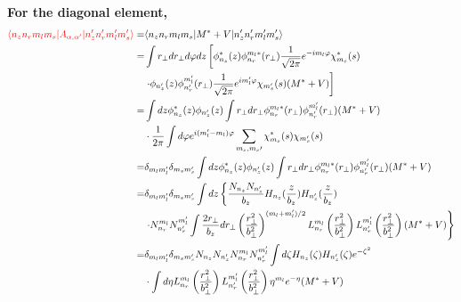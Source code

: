 \textbf{For the diagonal element,}
\begin{equation}
\begin{aligned}
  \textcolor{red}{\langle n_z n_r m_l m_s | A_{\alpha, \alpha^{\prime}} | n_z^{\prime} n_r^{\prime} m_l^{\prime} m_s^{\prime} \rangle} 
  =& \langle n_z n_r m_l m_s | M^* + V | n_z^{\prime} n_r^{\prime} m_l^{\prime} m_s^{\prime} \rangle \\
  =& \int r_{\perp}dr_{\perp}d\varphi dz \left[ \phi_{n_z}^{\ast}(z) \phi_{n_r}^{m_l\ast}(r_{\perp}) \frac{1}{\sqrt{2\pi}}e^{-im_l\varphi} \chi_{m_s}^{\ast}(s) \right.\\
  & \left. \cdot \phi_{n_z^{\prime}}(z) \phi_{n_r^{\prime}}^{m_l^{\prime}}(r_{\perp}) \frac{1}{\sqrt{2\pi}}e^{im_l^{\prime}\varphi} \chi_{m_s^{\prime}}(s) (M^{\ast} + V) \right]  \\
  =& \int dz \phi_{n_z}^{\ast}(z)\phi_{n_z^{\prime}}(z) \int r_{\perp}dr_{\perp}\phi_{n_r}^{m_l\ast}(r_{\perp})\phi_{n_r^{\prime}}^{m_l^{\prime}}(r_{\perp})(M^{\ast}+V)  \\
  & \cdot \frac{1}{2\pi} \int d\varphi e^{i(m_l^{\prime} - m_l)\varphi} \sum_{m_s, m_{s}{\prime}} \chi_{m_s}^{\ast}(s)\chi_{m_s^{\prime}}(s)  \\
  =& \delta_{m_l m_l^{\prime}} \delta_{m_s m_s^{\prime}}\int dz \phi_{n_z}^{\ast}(z)\phi_{n_z^{\prime}}(z) \int r_{\perp}dr_{\perp}\phi_{n_r}^{m_l\ast}(r_{\perp})\phi_{n_r^{\prime}}^{m_l^{\prime}}(r_{\perp})(M^{\ast}+V) \\
  =& \delta_{m_l m_l^{\prime}} \delta_{m_s m_s^{\prime}} \int dz \left\{ \frac{N_{n_z} N_{n_z^{\prime}}}{b_z} H_{n_z}(\frac{z}{b_z})H_{n_z^{\prime}}(\frac{z}{b_z})\right. \\
  & \left. \cdot N_{n_r}^{m_l} N_{n_r^{\prime}}^{m_l^{\prime}} \int \frac{2r_{\perp}}{b_z}dr_{\perp} \left(\frac{r_{\perp}^2}{b_{\perp}^2}\right)^{(m_l + m_l^{\prime})/2} L_{n_r}^{m_l}\left(\frac{r_{\perp}^2}{b_{\perp}^2}\right) L_{n_r^{\prime}}^{m_l^{\prime}}\left(\frac{r_{\perp}^2}{b_{\perp}^2}\right) (M^{\ast} + V) \right\}  \\
  =& \delta_{m_l m_l^{\prime}} \delta_{m_s m_s^{\prime}} N_{n_z} N_{n_z^{\prime}} N_{n_r}^{m_l} N_{n_r^{\prime}}^{m_l^{\prime}} \int d\zeta H_{n_z}(\zeta) H_{n_z^{\prime}}(\zeta) e^{-\zeta^2} \\
  & \cdot \int d\eta L_{n_r}^{m_l}\left(\frac{r_{\perp}^2}{b_{\perp}^2}\right) L_{n_r^{\prime}}^{m_l^{\prime}}\left(\frac{r_{\perp}^2}{b_{\perp}^2}\right) \eta^{m_l}e^{-\eta} (M^{\ast} + V)
\end{aligned}
\end{equation}
